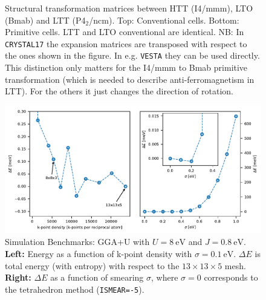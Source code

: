 \begin{figure}
    \centering
    
    \caption[Structural transformation matrices]{Structural transformation matrices between HTT (I4/mmm), LTO (Bmab) and LTT (P4$_2$/ncm). Top: Conventional cells. Bottom: Primitive cells. LTT and LTO conventional are identical. NB: In \texttt{CRYSTAL17} the expansion matrices are transposed with respect to the ones shown in the figure. In e.g. \texttt{VESTA} they can be used directly. This distinction only matters for the I4/mmm to Bmab primitive transformation (which is needed to describe anti-ferromagnetism in LTT). For the others it just changes the direction of rotation.}
    \label{fig:matrices}
\end{figure}

\begin{figure}
    \centering
    \includegraphics{fig/simulation/convergence_afm.pdf}
    \caption[Simulation Benchmarks: GGA+U]{Simulation Benchmarks: GGA+U with $U=\SI{8}{\eV}$ and $J=\SI{0.8}{\eV}$. \textbf{Left:} Energy as a function of k-point density with $\sigma=\SI{0.1}{\eV}$. $\Delta E$ is total energy (with entropy) with respect to the $13 \times 13 \times 5$ mesh. \textbf{Right:} $\Delta E$ as a function of smearing $\sigma$, where $\sigma=0$ corresponds to the tetrahedron method (\texttt{ISMEAR=-5}).}
    \label{fig:sim_bench_afm}
\end{figure}

